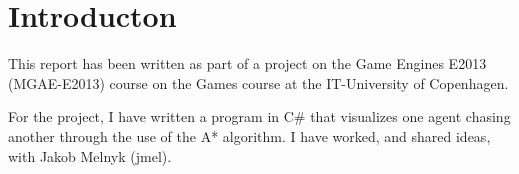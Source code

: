 \section{Introducton}
\label{01}

This report has been written as part of a project on the Game Engines E2013 (MGAE-E2013) course on the Games course at the IT-University of Copenhagen. 

For the project, I have written a program in C\# that visualizes one agent chasing another through the use of the A* algorithm. I have worked, and shared ideas, with Jakob Melnyk (jmel). 